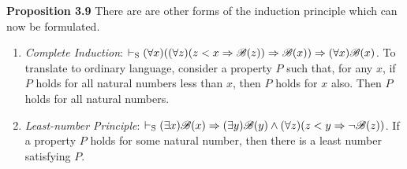 \textbf{Proposition 3.9}
There are are other forms of the induction principle which can now be formulated.
\begin{enumerate} [label = \alph*.]
    \item \textit{Complete Induction}: $\vdash_\text{S} (\forall x)((\forall z)(z<x \Rightarrow \mathscr{B}(z)) \Rightarrow \mathscr{B}(x)) \Rightarrow (\forall x)\mathscr{B}(x)$. To translate to ordinary language, consider a property $P$ such that, for any $x$, if $P$ holds for all natural numbers less than $x$, then $P$ holds for $x$ also. Then $P$ holds for all natural numbers.
    \item \textit{Least-number Principle}: $\vdash_\text{S} (\exists x) \mathscr{B}(x) \Rightarrow (\exists y) \mathscr{B}(y)\land (\forall z)(z<y \Rightarrow \lnot \mathscr{B}(z))$. If a property $P$ holds for some natural number, then there is a least number satisfying $P$.
\end{enumerate}


